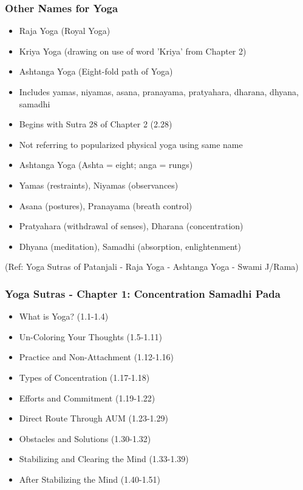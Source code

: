 \begin{frame}[fragile]\frametitle{Other Names for Yoga}
\begin{itemize}
\item Raja Yoga (Royal Yoga)
\item Kriya Yoga (drawing on use of word 'Kriya' from Chapter 2)
\item Ashtanga Yoga (Eight-fold path of Yoga)
\item Includes yamas, niyamas, asana, pranayama, pratyahara, dharana, dhyana, samadhi
\item Begins with Sutra 28 of Chapter 2 (2.28)
\item Not referring to popularized physical yoga using same name
\item Ashtanga Yoga (Ashta = eight; anga = rungs)
\item Yamas (restraints), Niyamas (observances)
\item Asana (postures), Pranayama (breath control)
\item Pratyahara (withdrawal of senses), Dharana (concentration)
\item Dhyana (meditation), Samadhi (absorption, enlightenment)
\end{itemize}
  
  \tiny{(Ref: Yoga Sutras of Patanjali - Raja Yoga - Ashtanga Yoga - Swami J/Rama)}

\end{frame}


\begin{frame}[fragile]\frametitle{Yoga Sutras - Chapter 1: Concentration Samadhi Pada}
\begin{itemize}
\item What is Yoga? (1.1-1.4)
\item Un-Coloring Your Thoughts (1.5-1.11)
\item Practice and Non-Attachment (1.12-1.16)
\item Types of Concentration (1.17-1.18)
\item Efforts and Commitment (1.19-1.22)
\item Direct Route Through AUM (1.23-1.29)
\item Obstacles and Solutions (1.30-1.32)
\item Stabilizing and Clearing the Mind (1.33-1.39)
\item After Stabilizing the Mind (1.40-1.51)
\end{itemize}
\end{frame}

